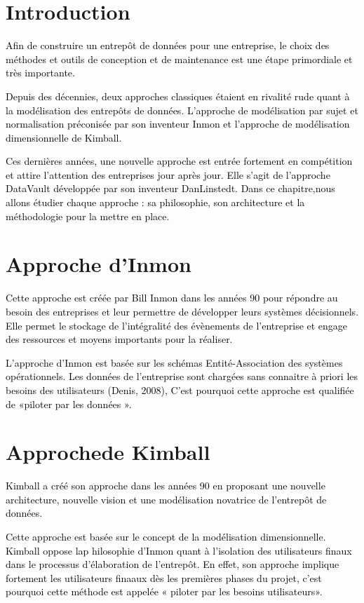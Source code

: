 \documentclass[a4paper,12pt]{report}
\begin{document}
\section*{Introduction}
\textcolor{black}{Afin de construire un entrepôt de données pour une entreprise, le choix des méthodes et outils de conception et de maintenance est une étape primordiale et très importante.}

\textcolor{black}{Depuis des décennies, deux approches classiques étaient en rivalité rude quant à la modélisation des entrepôts de données. L’approche de modélisation par sujet et normalisation préconisée par son inventeur Inmon et l’approche de modélisation dimensionnelle de Kimball.}

\textcolor{black}{Ces dernières années, une nouvelle approche est entrée fortement en compétition et attire l’attention des entreprises jour après jour. Elle s’agit de l’approche DataVault
développée par son inventeur DanLinstedt. Dans ce chapitre,nous allons étudier chaque approche : sa philosophie, son architecture et la méthodologie pour la mettre en place.}

\section{Approche d’Inmon}
\textcolor{black}{Cette approche est créée par Bill Inmon dans les années 90 pour répondre au besoin des entreprises et leur permettre de développer leurs systèmes décisionnels. Elle permet le
stockage de l’intégralité des évènements de l’entreprise et engage des ressources et moyens importants pour la réaliser.}

\textcolor{black}{L’approche d’Inmon est basée sur les schémas Entité-Association des systèmes opérationnels. Les données de l’entreprise sont chargées sans connaitre à priori les besoins des
utilisateurs (Denis, 2008), C’est pourquoi cette approche est qualifiée de «piloter par les données ».}

\section{Approchede Kimball}
\textcolor{black}{Kimball a créé son approche dans les années 90 en proposant une nouvelle architecture, nouvelle vision et une modélisation novatrice de l’entrepôt de données.}

\textcolor{black}{Cette approche est basée sur le concept de la modélisation dimensionnelle. Kimball
oppose lap hilosophie d’Inmon quant à l’isolation des utilisateurs finaux dans le processus d’élaboration de l’entrepôt. En effet, son approche implique fortement les utilisateurs
finaaux dès les premières phases du projet, c’est pourquoi cette méthode est appelée « piloter par les besoins utilisateurs».}
\end{document}
